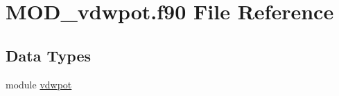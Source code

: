 \hypertarget{MOD__vdwpot_8f90}{\section{M\-O\-D\-\_\-vdwpot.\-f90 File Reference}
\label{MOD__vdwpot_8f90}
}
\subsection*{Data Types}
\begin{DoxyCompactItemize}
\item 
module \hyperlink{classvdwpot}{vdwpot}
\end{DoxyCompactItemize}

